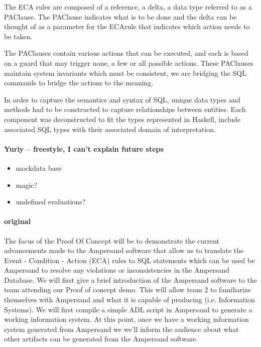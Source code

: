 \documentclass[12pt]{article}
\begin{document}
The ECA rules are composed of a reference, a delta, a data type referred to as 
a PAClause. The PAClause indicates what is to be done and the delta can be 
thought of as a parameter for the ECArule that indicates which action needs to 
be taken. 

The PAClauses contain various actions that can be executed, and each is based 
on a guard that may trigger none, a few or all possible actions. These 
PAClauses maintain system invariants which must be consistent, we are bridging 
the SQL commands to bridge the actions to the meaning.

In order to capture the semantics and syntax of SQL, unique data types and 
methods had to be constructed to capture relationships between entities. Each 
component was deconstructed to fit the types represented in Haskell, include 
associated SQL types with their associated domain of interpretation. 

\paragraph{Yuriy -- freestyle, I can't explain future steps}
\begin{itemize}
	\item mockdata base
	\item magic?
	\item undefined evaluations?
\end{itemize}

\paragraph{original}
The focus of the Proof Of Concept will be to demonstrate the current 
advancements made to the Ampersand software that allow us to translate the 
Event - Condition - Action (ECA) rules to SQL statements which can be used be 
Ampersand to resolve any violations or inconsistencies in the Ampersand 
Database.
\newline\newline
\indent We will first give a brief introduction of the Ampersand software to 
the team attending our Proof of concept demo. This will allow team 2 to 
familiarize themselves with Ampersand and what it is capable of producing 
\big(i.e. 
Information Systems\big). We will first compile a simple ADL script in 
Ampersand to 
generate a working information system. At this point, once we have a working 
information system generated from Ampersand we we'll inform the audience about 
what other artifacts can be generated from the Ampersand software.
\end{document}
